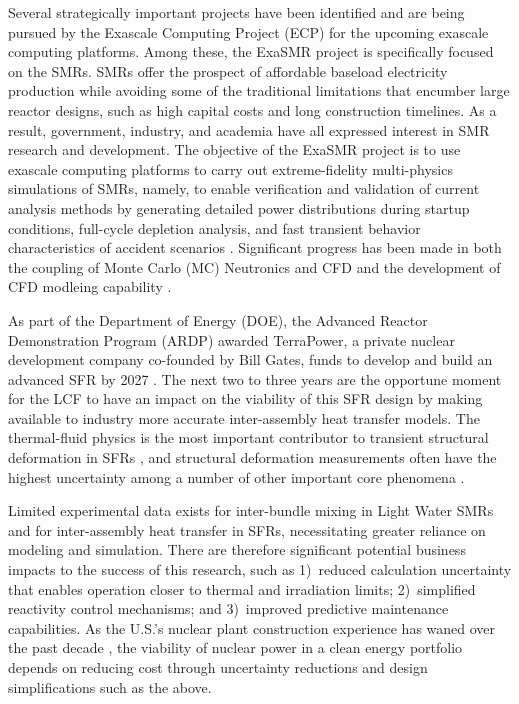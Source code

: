 Several strategically important projects have been identified and are being pursued by 
the Exascale Computing Project (ECP) for the upcoming exascale computing platforms. 
Among these, the ExaSMR project is specifically focused on the SMRs.
SMRs offer the prospect of affordable baseload electricity production while 
avoiding some of the traditional limitations that encumber large reactor designs, 
such as high capital costs and long construction timelines. 
As a result, government, industry, and academia have all expressed interest in 
SMR research and development.
The objective of the ExaSMR project is to use exascale computing platforms to 
carry out extreme-fidelity multi-physics simulations of SMRs, namely, 
to enable verification and validation of current analysis methods by 
generating detailed power distributions during startup conditions, 
full-cycle depletion analysis, and fast transient behavior characteristics of 
accident scenarios \cite{Merzari2018}. 
Significant progress has been made in both the coupling of Monte Carlo (MC) Neutronics 
and CFD \cite{Hamilton2018,Hamilton2019} and the development of CFD modleing 
capability \cite{Fang2021,Merzari2018}.

As part of the Department of Energy (DOE), the Advanced Reactor Demonstration
Program (ARDP) awarded TerraPower, a private nuclear development company
co-founded by Bill Gates, funds
to develop and build an advanced SFR by 2027 \cite{ardp_tp}. The next two to
three years are the opportune moment for the LCF to have an impact on the
viability of this SFR design by making available to industry more accurate
inter-assembly heat transfer models. The thermal-fluid physics is the most important
contributor to transient structural deformation in SFRs \cite{wozniak}, and
structural deformation measurements often have the highest uncertainty among a number of
other important core phenomena \cite{lum}. 

Limited experimental data exists for inter-bundle mixing in Light Water SMRs
and for inter-assembly heat transfer in SFRs, necessitating greater reliance on
modeling and simulation. There
are therefore significant potential business impacts to the success of this
research, such as 1)~reduced calculation uncertainty that enables operation closer
to thermal and irradiation limits; 2)~simplified reactivity control mechanisms;
and 3)~improved predictive maintenance capabilities. 
As the U.S.'s nuclear plant construction
experience has waned over the past decade \cite{schlissel}, the viability of
nuclear power in a clean energy portfolio depends on reducing cost through
uncertainty reductions and design simplifications such as the above.

